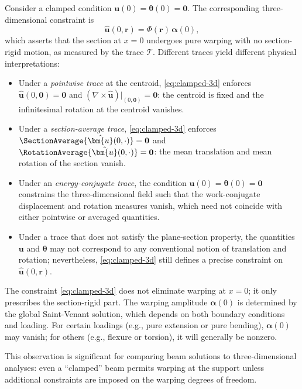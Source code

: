 \begin{remark}
Consider a clamped condition $\bm{u}(0) = \bm{\theta}(0) = \mathbf{0}$. 
The corresponding three-dimensional constraint is
\begin{equation}
\hat{\bm{u}}(0, \bm{r}) = \Phi(\bm{r})\,\bm{\alpha}(0),
\label{eq:clamped-3d}
\end{equation}
which asserts that the section at $x = 0$ undergoes pure warping with no 
section-rigid motion, as measured by the trace $\mathcal{T}$. Different traces 
yield different physical interpretations:
\begin{itemize}
\item Under a \emph{pointwise trace} at the centroid, \eqref{eq:clamped-3d} 
enforces $\hat{\bm{u}}(0, \mathbf{0}) = \mathbf{0}$ and 
$(\nabla \times \hat{\bm{u}})|_{(0,\mathbf{0})} = \mathbf{0}$: the centroid is fixed 
and the infinitesimal rotation at the centroid vanishes.

\item Under a \emph{section-average trace}, \eqref{eq:clamped-3d} enforces 
$\SectionAverage{\hat{\bm{u}}(0,\cdot)} = \mathbf{0}$ and 
$\RotationAverage{\hat{\bm{u}}(0,\cdot)} = \mathbf{0}$: the mean translation 
and mean rotation of the section vanish.

\item Under an \emph{energy-conjugate trace}, the condition 
$\bm{u}(0) = \bm{\theta}(0) = \mathbf{0}$ constrains the three-dimensional field 
such that the work-conjugate displacement and rotation measures vanish, 
which need not coincide with either pointwise or averaged quantities.

\item Under a trace that does not satisfy the plane-section property, the 
quantities $\bm{u}$ and $\bm{\theta}$ may not correspond to any conventional 
notion of translation and rotation; nevertheless, \eqref{eq:clamped-3d} 
still defines a precise constraint on $\hat{\bm{u}}(0, \bm{r})$.
\end{itemize}
\end{remark}

\begin{remark}
The constraint \eqref{eq:clamped-3d} does not eliminate warping at $x = 0$; 
it only prescribes the section-rigid part. The warping amplitude 
$\bm{\alpha}(0)$ is determined by the global Saint-Venant solution, which 
depends on both boundary conditions and loading. For certain loadings 
(e.g., pure extension or pure bending), $\bm{\alpha}(0)$ may vanish; for 
others (e.g., flexure or torsion), it will generally be nonzero.

This observation is significant for comparing beam solutions to 
three-dimensional analyses: even a ``clamped'' beam permits warping at the 
support unless additional constraints are imposed on the warping degrees 
of freedom.
\end{remark}

